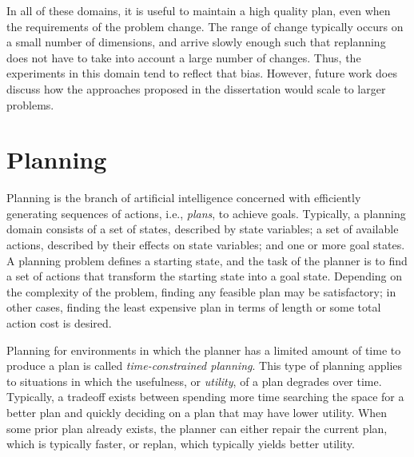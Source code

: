 In all of these domains, it is useful to maintain a high quality plan, even when the requirements of the problem change.  The range of change typically occurs on a small number of dimensions, and arrive slowly enough such that replanning does not have to take into account a large number of changes.  Thus, the experiments in this domain tend to reflect that bias.  However, future work does discuss how the approaches proposed in the dissertation would scale to larger problems.



\section{Planning}

Planning is the branch of artificial intelligence concerned with efficiently generating sequences of actions, i.e., \textit{plans}, to achieve goals.  Typically, a planning domain consists of a set of states, described by state variables; a set of available actions, described by their effects on state variables; and one or more goal states.  A planning problem defines a starting state, and the task of the planner is to find a set of actions that transform the starting state into a goal state.  Depending on the complexity of the problem, finding any feasible plan may be satisfactory; in other cases, finding the least expensive plan in terms of length or some total action cost is desired.

Planning for environments in which the planner has a limited amount of time to produce a plan is called \textit{time-constrained planning}.  This type of planning applies to situations in which the usefulness, or \textit{utility}, of a plan degrades over time.  Typically, a tradeoff exists between spending more time searching the space for a better plan and quickly deciding on a plan that may have lower utility.  When some prior plan already exists, the planner can either repair the current plan, which is typically faster, or replan, which typically yields better utility.



